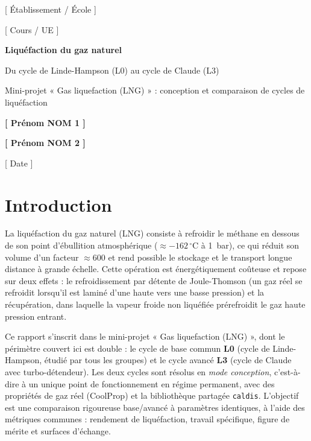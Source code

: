 \begin{titlepage}
  \centering
  \vspace*{2.5cm}
  {\large [ Établissement / École ] \par}
  \vspace{0.4cm}
  {\large [ Cours / UE ] \par}
  \vspace{2.5cm}
  {\Huge\bfseries Liquéfaction du gaz naturel \par}
  \vspace{0.8cm}
  {\LARGE Du cycle de Linde-Hampson (L0) au cycle de Claude (L3) \par}
  \vspace{0.5cm}
  {\large Mini-projet « Gas liquefaction (LNG) » : conception et comparaison
   de cycles de liquéfaction \par}
  \vspace{2.5cm}
  {\large\bfseries [ Prénom NOM 1 ] \par}
  {\large\bfseries [ Prénom NOM 2 ] \par}
  \vfill
  {\large [ Date ] \par}
  \vspace{1cm}
\end{titlepage}

\section*{Introduction}

La liquéfaction du gaz naturel (LNG) consiste à refroidir le méthane en
dessous de son point d'ébullition atmosphérique ($\approx -162\,^\circ$C à
1~bar), ce qui réduit son volume d'un facteur $\approx 600$ et rend possible
le stockage et le transport longue distance à grande échelle. Cette opération
est énergétiquement coûteuse et repose sur deux effets : le refroidissement
par détente de Joule-Thomson (un gaz réel se refroidit lorsqu'il est laminé
d'une haute vers une basse pression) et la récupération, dans laquelle la
vapeur froide non liquéfiée prérefroidit le gaz haute pression entrant.

Ce rapport s'inscrit dans le mini-projet « Gas liquefaction (LNG) », dont le
périmètre couvert ici est double : le cycle de base commun \textbf{L0}
(cycle de Linde-Hampson, étudié par tous les groupes) et le cycle avancé
\textbf{L3} (cycle de Claude avec turbo-détendeur). Les deux cycles sont
résolus en \emph{mode conception}, c'est-à-dire à un unique point de
fonctionnement en régime permanent, avec des propriétés de gaz réel
(CoolProp) et la bibliothèque partagée \texttt{caldis}. L'objectif est une
comparaison rigoureuse base/avancé à paramètres identiques, à l'aide des
métriques communes : rendement de liquéfaction, travail spécifique, figure
de mérite et surfaces d'échange.

